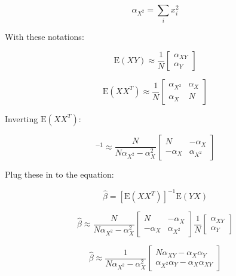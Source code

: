 \documentclass{article}
\begin{document}
\begin{equation}
    \alpha_{X^2} = \sum_i x^2_i
\end{equation}

With these notations:

\begin{equation}
    \text{E}(XY) \approx \frac 1N \begin{bmatrix} \alpha_{XY} \\ \alpha_Y \end{bmatrix}
\end{equation}

\begin{equation}
    \text{E}(XX^T) \approx \frac 1N \begin{bmatrix} \alpha_{X^2} & \alpha_X \\ \alpha_X & N \end{bmatrix}
\end{equation}

Inverting $\text{E}(XX^T)$:

\begin{equation}
    [\text{E}(XX^T)]^{-1} \approx \frac{N}{N\alpha_{X^2} - \alpha^2_X} \begin{bmatrix} N & -\alpha_X \\ -\alpha_X & \alpha_{X^2} \end{bmatrix}
\end{equation}

Plug these in to the equation:

\begin{equation}
    \hat{\beta} = [\text{E} (XX^T)]^{-1} \text{E} (YX)
\end{equation}

\begin{equation}
    \hat{\beta} \approx \frac{N}{N\alpha_{X^2} - \alpha^2_X} \begin{bmatrix} N & -\alpha_X \\ -\alpha_X & \alpha_{X^2} \end{bmatrix} \frac 1N \begin{bmatrix} \alpha_{XY} \\ \alpha_Y \end{bmatrix}
\end{equation}

\begin{equation}
    \hat{\beta} \approx \frac{1}{N\alpha_{X^2} - \alpha^2_X} \begin{bmatrix} N \alpha_{XY} -\alpha_X \alpha_Y \\ \alpha_{X^2} \alpha_Y - \alpha_X \alpha_{XY} \end{bmatrix}
\end{equation}
\end{document}
